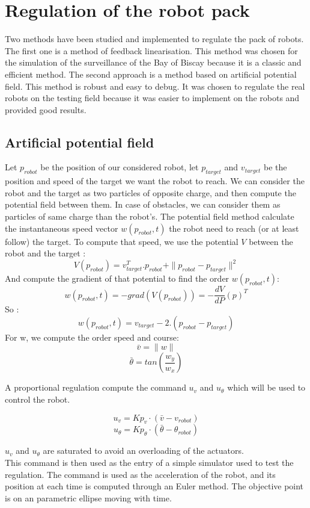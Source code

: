 \section{Regulation of the robot pack}

Two methods have been studied and implemented to regulate the pack of robots. The first one is a method of feedback linearisation. This method was chosen for the simulation of the surveillance of the Bay of Biscay because it is a classic and efficient method. The second approach is a method based on artificial potential field. This method is robust and easy to debug. It was chosen to regulate the real robots on the testing field because it was easier to implement on the robots and provided good results.

\subsection{Artificial potential field}
Let $p_{robot}$ be the position of our considered robot, let $p_{target}$ and $v_{target}$ be the position and speed of the target we want the robot to reach.
We can consider the robot and the target as two particles of opposite charge, and then compute the potential field between them. In case of obstacles, we can consider them as particles of same charge than the robot's.
The potential field method calculate the instantaneous speed vector $w(p_{robot},t)$ the robot need to reach (or at least follow) the target. To compute that speed, we use the potential $V$ between the robot and the target :\\
\[ V(p_{robot}) = v^T_{target}. p_{robot} + \|p_{robot}-p_{target}\|^2 \]
And compute the gradient of that potential to find the order $w(p_{robot},t)$:
\[w(p_{robot},t) = -grad(V(p_{robot})) = -\frac{dV}{dP}(p)^T\]
So :
\[w(p_{robot},t) = v_{target}-2.(p_{robot}-p_{target})\]
For w, we compute the order speed and course:
\[\bar{v} = \|w\| \]
\[\bar{\theta} = tan(\frac{w_y}{w_x})\]

A proportional regulation compute the command $u_v$ and $u_{\theta}$ which will be used to control the robot.

\[ u_v = Kp_v \cdot (\bar{v}-v_{robot}) \]
\[ u_{\theta} = Kp_{\theta} \cdot (\bar{\theta}-\theta_{robot}) \]

$u_v$ and $u_{\theta}$ are saturated to avoid an overloading of the actuators.\\

This command is then used as the entry of a simple simulator used to test the regulation.
The command is used as the acceleration of the robot, and its position at each time is computed through an Euler method. The objective point is on an parametric ellipse moving with time.\\

